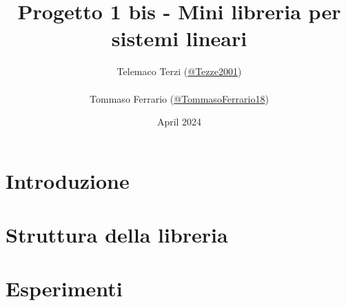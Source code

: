\documentclass[a4paper, oneside]{report}
\title{Progetto 1 bis - Mini libreria per sistemi lineari}
\author{
    Telemaco Terzi (\href{https://github.com/Tezze2001}{@Tezze2001}) \\\\
    Tommaso Ferrario (\href{https://github.com/TommasoFerrario18}{@TommasoFerrario18})
    }
\date{April 2024}
\begin{document}
\maketitle
\newtheorem{teorema}{Teorema}
\newtheorem{dimostrazione}{Dimostrazione}
\newtheorem{definizione}{Definizione}
\newtheorem{esempio}{Esempio}

\tableofcontents
\chapter{Introduzione}
\chapter{Struttura della libreria}
\chapter{Esperimenti}
\end{document}
